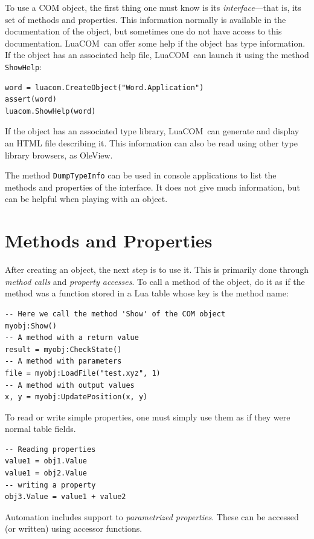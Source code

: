 \documentclass[11pt,a4paper,english]{report}
\newcommand{\ident}[1]{\mbox{\texttt{#1}}}
\newcommand{\techname}[1]{\mbox{#1}}
\newcommand{\luacom}{\techname{LuaCOM}}
\begin{document}
To use a COM object, the first thing one must know is its
\emph{interface}---that is, its set of methods and properties. This
information normally is available in the documentation of the object,
but sometimes one do not have access to this documentation. \luacom\
can offer some help if the object has type information. If the object
has an associated help file, \luacom\ can launch it using the method
\ident{ShowHelp}:

\begin{verbatim}
word = luacom.CreateObject("Word.Application")
assert(word)
luacom.ShowHelp(word)
\end{verbatim}

If the object has an associated type library, \luacom\ can generate
and display an HTML file describing it. This information can also be
read using other type library browsers, as OleView.

The method \ident{DumpTypeInfo} can be used in console applications to
list the methods and properties of the interface. It does not give
much information, but can be helpful when playing with an object.


\section{Methods and Properties}

After creating an object, the next step is to use it. This is
primarily done through \emph{method calls} and \emph{property
accesses}. To call a method of the object, do it as if the method was
a function stored in a Lua table whose key is the method name:

\begin{verbatim}
-- Here we call the method 'Show' of the COM object
myobj:Show()
-- A method with a return value
result = myobj:CheckState()
-- A method with parameters
file = myobj:LoadFile("test.xyz", 1)
-- A method with output values
x, y = myobj:UpdatePosition(x, y)
\end{verbatim}

To read or write simple properties, one must simply use them as if
they were normal table fields.

\begin{verbatim}
-- Reading properties
value1 = obj1.Value
value1 = obj2.Value
-- writing a property
obj3.Value = value1 + value2
\end{verbatim}

Automation includes support to \emph{parametrized properties}. These
can be accessed (or written) using accessor functions.
\end{document}
